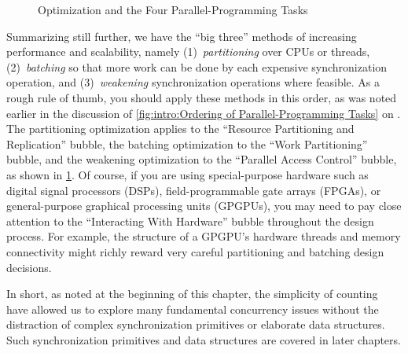 \begin{figure}
\centering
{}
\caption{Optimization and the Four Parallel-Programming Tasks}
\label{fig:count:Optimization and the Four Parallel-Programming Tasks}
\end{figure}

Summarizing still further, we have the ``big three'' methods of
increasing performance and scalability, namely
(1)~\emph{partitioning} over CPUs or threads,
(2)~\emph{batching} so that more work can be done by each expensive
synchronization operation, and
(3)~\emph{weakening} synchronization operations where feasible.
As a rough rule of thumb, you should apply these methods in this order,
as was noted earlier in the discussion of
\cref{fig:intro:Ordering of Parallel-Programming Tasks}
on
.
The partitioning optimization applies to the
``Resource Partitioning and Replication'' bubble,
the batching optimization to the ``Work Partitioning'' bubble,
and the weakening optimization to the ``Parallel Access Control'' bubble,
as shown in
\cref{fig:count:Optimization and the Four Parallel-Programming Tasks}.
Of course, if you are using special-purpose hardware such as
digital signal processors (DSPs), field-programmable gate arrays (FPGAs),
or general-purpose graphical processing units (GPGPUs), you may need
to pay close attention to the ``Interacting With Hardware'' bubble
throughout the design process.
For example, the structure of a GPGPU's hardware threads and memory
connectivity might richly reward very careful partitioning
and batching design decisions.

In short, as noted at the beginning of this chapter, the simplicity
of counting have allowed us to explore many
fundamental concurrency issues without the distraction of
complex synchronization primitives or elaborate data structures.
Such synchronization primitives and data structures are covered
in later chapters.

